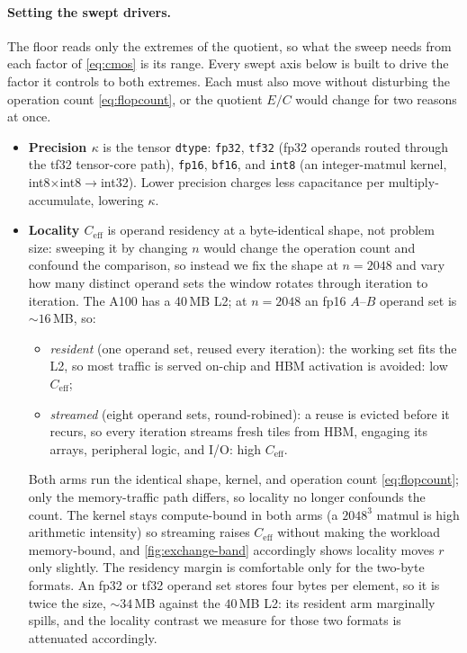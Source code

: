 \documentclass{article}
\theoremstyle{plain}
\theoremstyle{definition}
\theoremstyle{remark}
\begin{document}
\paragraph{Setting the swept drivers.}
The floor reads only the extremes of the quotient, so what
the sweep needs from each factor of \cref{eq:cmos} is its range. Every swept axis below is built to drive the factor it controls to both extremes.
Each must also move without disturbing the operation count
\cref{eq:flopcount}, or the quotient $E/C$ would change for two reasons at
once.
\begin{itemize}
	\item \textbf{Precision $\kappa$} is the tensor \texttt{dtype}:
	\texttt{fp32}, \texttt{tf32} (fp32 operands routed through the tf32
	tensor-core path), \texttt{fp16}, \texttt{bf16}, and \texttt{int8} (an
	integer-matmul kernel, int8$\times$int8$\to$int32). Lower precision
	charges less capacitance per multiply-accumulate, lowering $\kappa$.
	\item \textbf{Locality $C_{\mathrm{eff}}$} is operand residency
	at a byte-identical shape, not problem size: sweeping it by changing $n$
	would change the operation count and confound the comparison, so instead
	we fix the shape at $n = 2048$ and vary how many distinct operand sets
	the window rotates through iteration to iteration. The A100 has a
	40\,MB L2; at $n = 2048$ an fp16 $A$--$B$ operand set is ${\sim}16$\,MB,
	so:
	\begin{itemize}
		\item \emph{resident} (one operand set, reused every iteration): the
		working set fits the L2, so most traffic is served on-chip and HBM
		activation is avoided: low $C_{\mathrm{eff}}$;
		\item \emph{streamed} (eight operand sets, round-robined): a reuse is
		evicted before it recurs, so every iteration streams fresh tiles from
		HBM, engaging its arrays, peripheral logic, and I/O: high
		$C_{\mathrm{eff}}$.
	\end{itemize}
	Both arms run the identical shape, kernel, and operation count
	\cref{eq:flopcount}; only the memory-traffic path differs, so locality no
	longer confounds the count. The kernel stays compute-bound in both
	arms (a $2048^3$ matmul is high arithmetic intensity) so streaming
	raises $C_{\mathrm{eff}}$ without making the workload memory-bound, and
	\cref{fig:exchange-band} accordingly shows locality moves $r$ only
	slightly. The residency margin is comfortable only for the two-byte
	formats. An fp32 or tf32 operand set stores four bytes per element, so it
	is twice the size, ${\sim}34$\,MB against the $40$\,MB L2: its resident arm
	marginally spills, and the locality contrast we measure for those two
	formats is attenuated accordingly.
\end{itemize}
\end{document}
